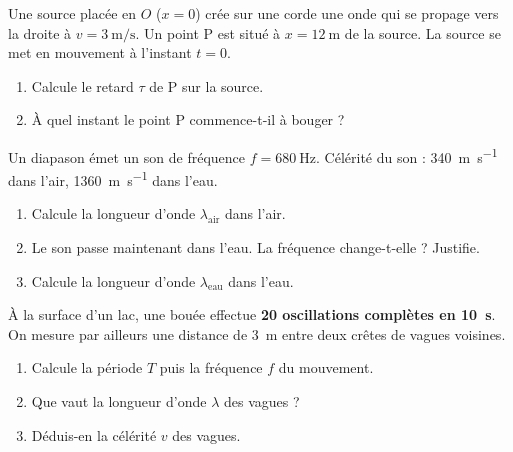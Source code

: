 \documentclass[11pt,a4paper]{article}
\newcommand{\vv}[1]{\vec{#1}}\newcommand{\ds}{\displaystyle}
\begin{document}
\begin{exo}
Une source placée en $O$ ($x=0$) crée sur une corde une onde qui se propage vers la droite à
$v=\SI{3}{\metre\per\second}$. Un point P est situé à $x=\SI{12}{\metre}$ de la source.
La source se met en mouvement à l'instant $t=0$.
\begin{center}
\end{center}
\begin{enumerate}[label=\alph*)]
  \item Calcule le retard $\tau$ de P sur la source.
  \item À quel instant le point P commence-t-il à bouger ?
\end{enumerate}
\end{exo}

\begin{exo}
Un diapason émet un son de fréquence $f=\SI{680}{\hertz}$. Célérité du son :
\SI{340}{\metre\per\second} dans l'air, \SI{1360}{\metre\per\second} dans l'eau.
\begin{enumerate}[label=\alph*)]
  \item Calcule la longueur d'onde $\lambda_{\text{air}}$ dans l'air.
  \item Le son passe maintenant dans l'eau. La fréquence change-t-elle ? Justifie.
  \item Calcule la longueur d'onde $\lambda_{\text{eau}}$ dans l'eau.
\end{enumerate}
\end{exo}

\begin{exo}
À la surface d'un lac, une bouée effectue \textbf{20 oscillations complètes en \SI{10}{\second}}.
On mesure par ailleurs une distance de \SI{3}{\metre} entre deux crêtes de vagues voisines.
\begin{enumerate}[label=\alph*)]
  \item Calcule la période $T$ puis la fréquence $f$ du mouvement.
  \item Que vaut la longueur d'onde $\lambda$ des vagues ?
  \item Déduis-en la célérité $v$ des vagues.
\end{enumerate}
\end{exo}
\end{document}
